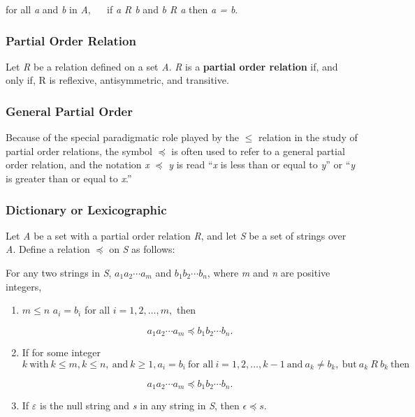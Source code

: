 \documentclass[12pt]{article}
\begin{document}
\begin{center}
for all \textit{a} and \textit{b} in \textit{A}, $\quad$ if \textit{a R b} and \textit{b R a} then \textit{a = b}.
\end{center}

\subsubsection*{Partial Order Relation}
Let \textit{R} be a relation defined on a set \textit{A}. \textit{R} is a \textbf{partial order relation} if, and only if, R is reflexive, antisymmetric, and transitive.

\subsubsection*{General Partial Order}
Because of the special paradigmatic role played by the $\leq$ relation in the study of partial order relations, the symbol $\preceq$ is often used to refer to a general partial order relation, and the notation \textit{x} $\preceq$ \textit{y} is read “\textit{x} is less than or equal to \textit{y}” or “\textit{y} is greater than or equal to \textit{x}.”

\subsubsection*{Dictionary or Lexicographic}
Let \textit{A} be a set with a partial order relation \textit{R}, and let \textit{S} be a set of strings over \textit{A}. Define a relation $\preceq$ on \textit{S} as follows:

For any two strings in \textit{S}, $a_1a_2 \cdots a_m$ and $b_1b_2 \cdots b_n$, where \textit{m} and \textit{n} are positive integers,

\begin{enumerate}
\item $m \leq n$ $a_i = b_i$ for all $i = 1, 2, \ldots, m,$ then

\begin{equation*}
a_1a_2 \cdots a_m \preceq b_1b_2 \cdots b_n.
\end{equation*}

\item If for some integer $k \ \text{with} \ k \leq m, k \leq n, \ \text{and} \ k \geq 1, a_i = b_i \ \text{for all} \ i = 1, 2, \ldots, k - 1 \ \text{and} \ a_k \neq b_k, \ \text{but} \ a_k \ R \ b_k \ \text{then}$

\begin{equation*}
a_1a_2 \cdots a_m \preceq b_1b_2 \cdots b_n.
\end{equation*}

\item If $\varepsilon$ is the null string and \textit{s} in any string in \textit{S}, then $\epsilon \preceq s$.
\end{enumerate}
\end{document}
